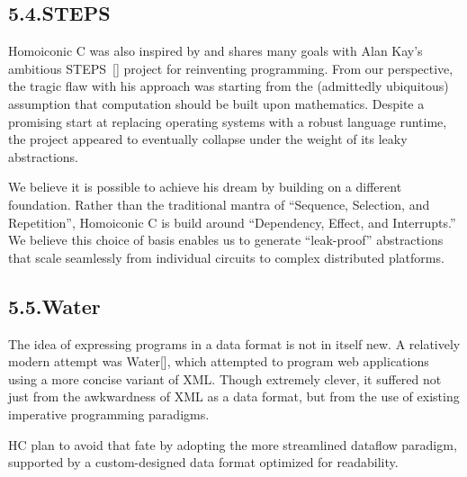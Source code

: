 \documentclass[preprint]{{acmart}}
\begin{document}
\subsection{5.4.\hspace*{0.5em}STEPS}\label{sec-steps}%

\noindent{}Homoiconic C was also inspired by and shares many goals with Alan Kay's
ambitious STEPS~{}[] project for reinventing programming. From our
perspective, the tragic flaw with his approach was starting from the
(admittedly ubiquitous) assumption that computation should be built upon
mathematics. Despite a promising start at replacing operating systems
with a robust language runtime, the project appeared to eventually
collapse under the weight of its leaky abstractions.%

We believe it is possible to achieve his dream by building on a different
foundation. Rather than the traditional mantra of \textquotedblleft{}Sequence, Selection,
and Repetition\textquotedblright{}, Homoiconic C is build around \textquotedblleft{}Dependency, Effect, and
Interrupts.\textquotedblright{} We believe this choice of basis enables us to generate
\textquotedblleft{}leak-proof\textquotedblright{} abstractions that scale seamlessly from individual circuits to complex distributed
platforms.%

\subsection{5.5.\hspace*{0.5em}Water}\label{sec-water}%

\noindent{}The idea of expressing programs in a data format is not in itself new. A
relatively modern attempt was Water[], which attempted to program
web applications using a more concise variant of XML. Though extremely
clever, it suffered not just from the awkwardness of XML as a data
format, but from the use of existing imperative programming paradigms.%

HC plan to avoid that fate by adopting the more streamlined dataflow paradigm,
supported by a custom-designed data format optimized for readability.%
\end{document}
